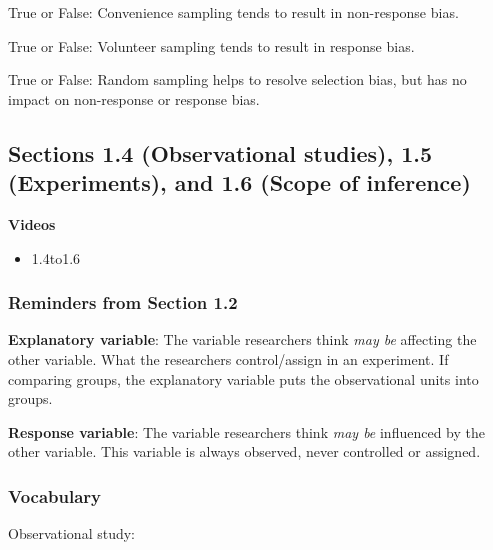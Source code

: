 \documentclass[
]{report}
\providecommand{\tightlist}{%
  \setlength{\itemsep}{0pt}\setlength{\parskip}{0pt}}
\newcommand{\rgs}{\vspace{12pt}} %
\begin{document}
True or False: Convenience sampling tends to result in non-response bias.

True or False: Volunteer sampling tends to result in response bias.

True or False: Random sampling helps to resolve selection bias, but has no impact on non-response or response bias.

\hypertarget{sections-1.4-observational-studies-1.5-experiments-and-1.6-scope-of-inference}{%
\subsection*{Sections 1.4 (Observational studies), 1.5 (Experiments), and 1.6 (Scope of inference)}\label{sections-1.4-observational-studies-1.5-experiments-and-1.6-scope-of-inference}}


\textbf{Videos}

\begin{itemize}
\tightlist
\item
  1.4to1.6
\end{itemize}


\hypertarget{reminders-from-section-1.2}{%
\subsubsection*{Reminders from Section 1.2}\label{reminders-from-section-1.2}}

\textbf{Explanatory variable}: The variable researchers think \emph{may be} affecting the other variable. What the researchers control/assign in an experiment. If comparing groups, the explanatory variable puts the observational units into groups.

\textbf{Response variable}: The variable researchers think \emph{may be} influenced by the other variable. This variable is always observed, never controlled or assigned.

\hypertarget{vocabulary-2}{%
\subsubsection*{Vocabulary}\label{vocabulary-2}}

Observational study:
\rgs
\end{document}
